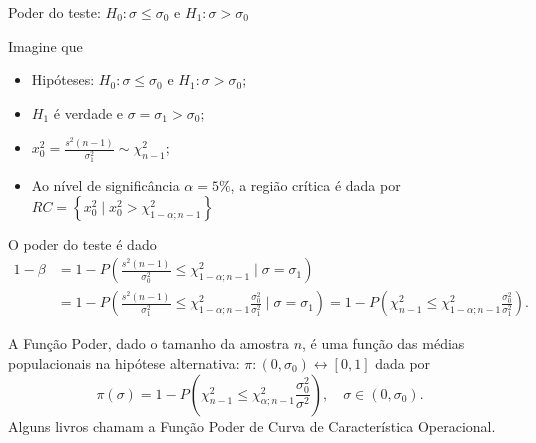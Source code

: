 \documentclass[8pt]{beamer}
\begin{document}
\begin{frame}{Poder do teste: $H_0: \sigma \leq \sigma_0$ e $H_1: \sigma > \sigma_0$}

Imagine que
\begin{itemize}
	\item Hipóteses: $H_0: \sigma \leq \sigma_0$ e $H_1: \sigma > \sigma_0$;
	\item $H_1$ é verdade e $\sigma = \sigma_1 > \sigma_0$;
	\item $x_0^2 = \frac{s^2(n-1)}{\sigma_1^2} \sim \chi_{n-1}^2$;
	\item Ao nível de significância $\alpha=5\%$, a região crítica é dada por $RC=\left\{ x_0^2 \mid x_0^2 > \chi_{1-\alpha; n-1}^2 \right\}$
\end{itemize}
\vfill

O poder do teste é dado
\begin{align*}
1- \beta &= 1 - P \left( \frac{s^2(n-1)}{\sigma_0^2} \leq \chi_{1-\alpha;n-1}^2 \mid \sigma = \sigma_1 \right)\\
&=1- P \left( \frac{s^2(n-1)}{\sigma_1^2} \leq \chi_{1-\alpha; n-1}^2 \frac{\sigma_0^2}{\sigma_1^2} \mid \sigma = \sigma_1 \right)= 1- P \left( \chi_{n-1}^2 \leq \chi_{1-\alpha; n-1}^2 \frac{\sigma_0^2}{\sigma_1^2} \right).
\end{align*}

A \textcolor{important}{Função Poder}, dado o tamanho da amostra $n$, é uma função das médias populacionais na hipótese alternativa: $\pi: (0,\sigma_0) \longleftrightarrow [0,1]$ dada por
$$\pi(\sigma) = 1 - P \left( \chi_{n-1}^2 \leq \chi_{\alpha; n-1}^2 \frac{\sigma_0^2}{\sigma^2} \right), \quad \sigma \in (0,\sigma_0).$$
Alguns livros chamam a Função Poder de  \textcolor{important}{Curva de Característica Operacional.}
\end{frame}
\end{document}
